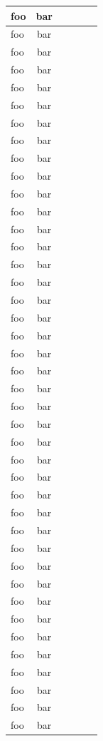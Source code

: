 \documentclass[notitlepage,a4paper,12pt]{article}
\begin{document}
\begin{ThreePartTable}
\begin{landscape}
\begin{longtable}{| l | c | l | l | l | l |}
    foo & bar \\ \hline
    foo & bar \\ \hline
    foo & bar \\ \hline 
    foo & bar \\ \hline
    foo & bar \\ \hline
    foo & bar \\ \hline
    foo & bar \\ \hline
    foo & bar \\ \hline
    foo & bar \\ \hline
    foo & bar \\ \hline
    foo & bar \\ \hline
    foo & bar \\ \hline
    foo & bar \\ \hline
    foo & bar \\ \hline 
    foo & bar \\ \hline
    foo & bar \\ \hline
    foo & bar \\ \hline
    foo & bar \\ \hline
    foo & bar \\ \hline
    foo & bar \\ \hline
    foo & bar \\ \hline
    foo & bar \\ \hline
    foo & bar \\ \hline
    foo & bar \\ \hline
    foo & bar \\ \hline 
    foo & bar \\ \hline
    foo & bar \\ \hline
    foo & bar \\ \hline
    foo & bar \\ \hline
    foo & bar \\ \hline
    foo & bar \\ \hline
    foo & bar \\ \hline
    foo & bar \\ \hline
    foo & bar \\ \hline
    foo & bar \\ \hline
    foo & bar \\ \hline 
    foo & bar \\ \hline
    foo & bar \\ \hline
    foo & bar \\ \hline
    foo & bar \\ \hline
    foo & bar \\ \hline

\end{longtable}
\end{landscape}
\end{ThreePartTable}
\end{document}
